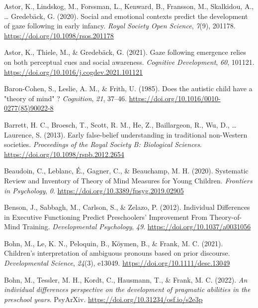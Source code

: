 \documentclass[
  man,floatsintext]{apa6}
\newlength{\cslhangindent}
\newlength{\cslentryspacingunit} %
\newenvironment{CSLReferences}[2] %
 {%
  \setlength{\parindent}{0pt}
  \ifodd #1
  \let\oldpar\par
  \def\par{\hangindent=\cslhangindent\oldpar}
  \fi
  \setlength{\parskip}{#2\cslentryspacingunit}
 }%
 {}
\begin{document}
\begin{CSLReferences}{1}{0}
\leavevmode{}%
Astor, K., Lindskog, M., Forssman, L., Kenward, B., Fransson, M., Skalkidou, A., \ldots{} Gredebäck, G. (2020). Social and emotional contexts predict the development of gaze following in early infancy. \emph{Royal Society Open Science}, \emph{7}(9), 201178. \url{https://doi.org/10.1098/rsos.201178}

\leavevmode{}%
Astor, K., Thiele, M., \& Gredebäck, G. (2021). Gaze following emergence relies on both perceptual cues and social awareness. \emph{Cognitive Development}, \emph{60}, 101121. \url{https://doi.org/10.1016/j.cogdev.2021.101121}

\leavevmode{}%
Baron-Cohen, S., Leslie, A. M., \& Frith, U. (1985). Does the autistic child have a "theory of mind" ? \emph{Cognition}, \emph{21}, 37--46. \url{https://doi.org/10.1016/0010-0277(85)90022-8}

\leavevmode{}%
Barrett, H. C., Broesch, T., Scott, R. M., He, Z., Baillargeon, R., Wu, D., \ldots{} Laurence, S. (2013). Early false-belief understanding in traditional non-{Western} societies. \emph{Proceedings of the Royal Society B: Biological Sciences}. \url{https://doi.org/10.1098/rspb.2012.2654}

\leavevmode{}%
Beaudoin, C., Leblanc, É., Gagner, C., \& Beauchamp, M. H. (2020). Systematic {Review} and {Inventory} of {Theory} of {Mind Measures} for {Young Children}. \emph{Frontiers in Psychology}, \emph{0}. \url{https://doi.org/10.3389/fpsyg.2019.02905}

\leavevmode{}%
Benson, J., Sabbagh, M., Carlson, S., \& Zelazo, P. (2012). Individual {Differences} in {Executive Functioning Predict Preschoolers}' {Improvement From Theory-of-Mind Training}. \emph{Developmental Psychology}, \emph{49}. \url{https://doi.org/10.1037/a0031056}

\leavevmode{}%
Bohn, M., Le, K. N., Peloquin, B., Köymen, B., \& Frank, M. C. (2021). Children's interpretation of ambiguous pronouns based on prior discourse. \emph{Developmental Science}, \emph{24}(3), e13049. \url{https://doi.org/10.1111/desc.13049}

\leavevmode{}%
Bohn, M., Tessler, M. H., Kordt, C., Hausmann, T., \& Frank, M. C. (2022). \emph{An individual differences perspective on the development of pragmatic abilities in the preschool years}. {PsyArXiv}. \url{https://doi.org/10.31234/osf.io/s2e3p}


\end{CSLReferences}
\end{document}
